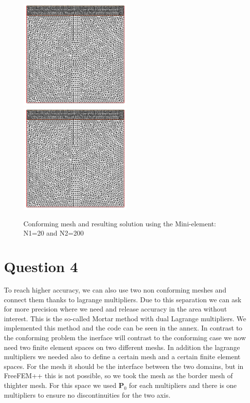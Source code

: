 \documentclass{article}
\begin{document}
\begin{figure}[h]
	\includegraphics[width=0.5\textwidth]{imgs/Mesh_100_50.PNG}
	\includegraphics[width=0.5\textwidth]{imgs/Mesh_100_50.PNG}
	\caption{Conforming mesh and resulting solution using the Mini-element:
	N1=20 and N2=200}
\end{figure}

\section*{Question 4}
To reach higher accuracy, we can also use two non conforming meshes and connect
them thanks to lagrange multipliers. Due to this separation we can ask for more
precision where we need and release accuracy in the area without interest. This
is the so-called Mortar method with dual Lagrange multipliers. We implemented
this method and the code can be seen in the annex.
In contrast to the conforming problem the inerface will
contrast to the conforming case we now need two finite element spaces on two
different meshs. In addition the lagrange multipliers we needed also to define
a certain mesh and a certain finite element spaces. For the mesh it should be
the
interface between the two domains, but in FreeFEM++ this is not possible, so we
took the mesh as the border mesh of thighter mesh. For this space we used 
$\mathbf{P}_0$ for each multipliers and there is one multipliers to ensure
no discontinuities for the two axis. 
\end{document}
